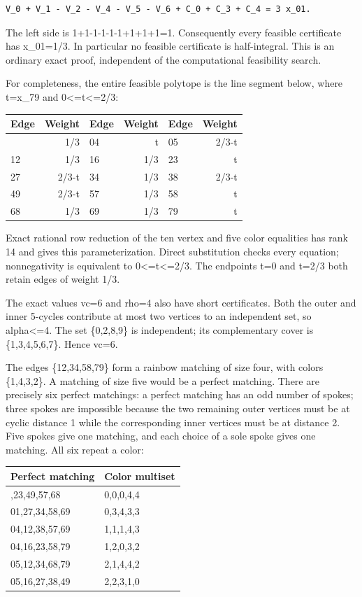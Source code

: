 \documentclass[11pt]{article}
\begin{document}
\begin{verbatim}
V_0 + V_1 - V_2 - V_4 - V_5 - V_6 + C_0 + C_3 + C_4 = 3 x_01.
\end{verbatim}

The left side is 1+1-1-1-1-1+1+1+1=1. Consequently every feasible certificate has x\_01=1/3. In particular no feasible certificate is half-integral. This is an ordinary exact proof, independent of the computational feasibility search.

For completeness, the entire feasible polytope is the line segment below, where t=x\_79 and 0\textless=t\textless=2/3:

{\def\LTcaptype{none} %
\begin{longtable}[]{@{}lrlrlr@{}}
\toprule\noalign{}
Edge & Weight & Edge & Weight & Edge & Weight \\
\midrule\noalign{}
\endhead
\bottomrule\noalign{}
\endlastfoot
01 & 1/3 & 04 & t & 05 & 2/3-t \\
12 & 1/3 & 16 & 1/3 & 23 & t \\
27 & 2/3-t & 34 & 1/3 & 38 & 2/3-t \\
49 & 2/3-t & 57 & 1/3 & 58 & t \\
68 & 1/3 & 69 & 1/3 & 79 & t \\
\end{longtable}
}

Exact rational row reduction of the ten vertex and five color equalities has rank 14 and gives this parameterization. Direct substitution checks every equation; nonnegativity is equivalent to 0\textless=t\textless=2/3. The endpoints t=0 and t=2/3 both retain edges of weight 1/3.

The exact values vc=6 and rho=4 also have short certificates. Both the outer and inner 5-cycles contribute at most two vertices to an independent set, so alpha\textless=4. The set \{0,2,8,9\} is independent; its complementary cover is \{1,3,4,5,6,7\}. Hence vc=6.

The edges \{12,34,58,79\} form a rainbow matching of size four, with colors \{1,4,3,2\}. A matching of size five would be a perfect matching. There are precisely six perfect matchings: a perfect matching has an odd number of spokes; three spokes are impossible because the two remaining outer vertices must be at cyclic distance 1 while the corresponding inner vertices must be at distance 2. Five spokes give one matching, and each choice of a sole spoke gives one matching. All six repeat a color:

{\def\LTcaptype{none} %
\begin{longtable}[]{@{}ll@{}}
\toprule\noalign{}
Perfect matching & Color multiset \\
\midrule\noalign{}
\endhead
\bottomrule\noalign{}
\endlastfoot
01,23,49,57,68 & 0,0,0,4,4 \\
01,27,34,58,69 & 0,3,4,3,3 \\
04,12,38,57,69 & 1,1,1,4,3 \\
04,16,23,58,79 & 1,2,0,3,2 \\
05,12,34,68,79 & 2,1,4,4,2 \\
05,16,27,38,49 & 2,2,3,1,0 \\
\end{longtable}
}
\end{document}
